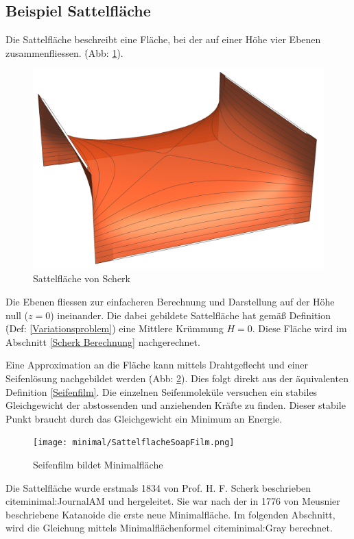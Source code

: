 \begin{refsection}
\subsection{Beispiel Sattelfläche}

Die Sattelfläche beschreibt eine Fläche, bei der auf einer Höhe vier Ebenen zusammenfliessen. \.(Abb: \ref{fig:Scherk}).
\begin{figure}
  \centering
  \includegraphics[scale=0.2]{minimal/HFSherk.png}
  \caption{Sattelfläche von Scherk} 
  \label{fig:Scherk}
\end{figure}
Die Ebenen fliessen zur einfacheren Berechnung und Darstellung auf der Höhe null ($z=0$) ineinander. Die dabei gebildete Sattelfläche hat gemäß Definition \. (Def: \ref{Variationsproblem}) eine Mittlere Krümmung $H=0$. Diese Fläche wird im Abschnitt \ref{Scherk Berechnung}  nachgerechnet.

Eine Approximation an die Fläche kann mittels Drahtgeflecht und einer Seifenlösung nachgebildet werden \. (Abb: \ref{fig:SoapScherk}). Dies folgt direkt aus der äquivalenten Definition \ref{Seifenfilm}. Die einzelnen Seifenmoleküle versuchen ein stabiles Gleichgewicht der abstossenden und anziehenden Kräfte zu finden. Dieser stabile Punkt braucht durch das Gleichgewicht ein Minimum an Energie.
\begin{figure}
  \centering
  \texttt{[image: minimal/SattelflacheSoapFilm.png]}
  \caption{Seifenfilm bildet Minimalfläche} 
  \label{fig:SoapScherk}
\end{figure}
Die Sattelfläche wurde erstmals 1834 von Prof. H. F. Scherk beschrieben cite{minimal:JournalAM} und hergeleitet. Sie war nach der in 1776 von Meusnier beschriebene Katanoide die erste neue Minimalfläche. Im folgenden Abschnitt, wird die Gleichung mittels Minimalflächenformel cite{minimal:Gray} berechnet.

\end{refsection}
